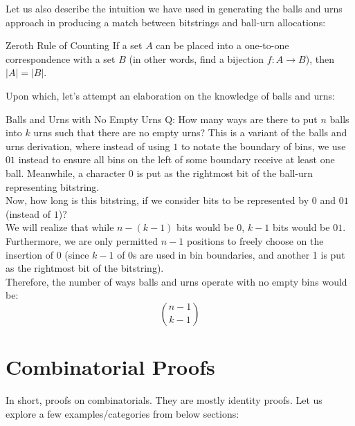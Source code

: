 Let us also describe the intuition we have used in generating the balls and urns approach in producing a match between bitstrings and ball-urn allocations:
\begin{ln-theorem}{Zeroth Rule of Counting}{}
    If a set $A$ can be placed into a one-to-one correspondence with a set $B$ (in other words, find a bijection $f: A \rightarrow B$), then $|A| = |B|$.
\end{ln-theorem}
Upon which, let's attempt an elaboration on the knowledge of balls and urns:
\begin{ln-think}{Balls and Urns with No Empty Urns}{}
    Q: How many ways are there to put $n$ balls into $k$ urns such that there are no empty urns?
    \tcblower
    This is a variant of the balls and urns derivation, where instead of using $1$ to notate the boundary of bins, we use $01$ instead to ensure all bins on the left of some boundary receive at least one ball. Meanwhile, a character $0$ is put as the rightmost bit of the ball-urn representing bitstring. \\
    Now, how long is this bitstring, if we consider bits to be represented by $0$ and $01$ (instead of $1$)? \\
    We will realize that while $n - (k - 1)$ bits would be $0$, $k - 1$ bits would be $01$. Furthermore, we are only permitted $n - 1$ positions to freely choose on the insertion of $0$ (since $k - 1$ of $0$s are used in bin boundaries, and another 1 is put as the rightmost bit of the bitstring). \\
    Therefore, the number of ways balls and urns operate with no empty bins would be:
    \[\binom{n - 1}{k - 1}\]
\end{ln-think}

\section{Combinatorial Proofs}
In short, proofs on combinatorials. They are mostly identity proofs. Let us explore a few examples/categories from below sections:

